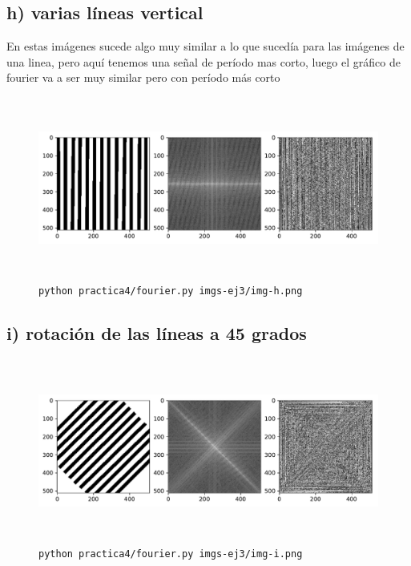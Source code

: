 \documentclass[11pt, spanish]{article}
\begin{document}
\subsection{h) varias líneas vertical}
En estas imágenes sucede algo muy similar a lo que sucedía para las imágenes de una linea, pero aquí tenemos una señal
de período mas corto, luego el gráfico de fourier va a ser muy similar pero con período más corto
\begin{figure}[H]
\centering
  \includegraphics[height=6cm]{informe-imgs/ej3-h.pdf}
  \caption{\texttt{python practica4/fourier.py imgs-ej3/img-h.png}}
\end{figure}

\subsection{i) rotación de las líneas a 45 grados}
\begin{figure}[H]
\centering
  \includegraphics[height=6cm]{informe-imgs/ej3-i.pdf}
  \caption{\texttt{python practica4/fourier.py imgs-ej3/img-i.png}}
\end{figure}
\end{document}
